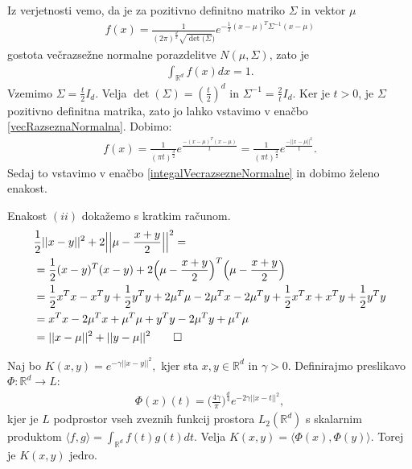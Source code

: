 \documentclass[mat1]{fmfdelo}
\newcommand{\R}{\mathbb R}
\begin{document}
\begin{dokaz}
	Iz verjetnosti vemo, da je za pozitivno definitno matriko $\Sigma$ in vektor $\mu$
	\begin{align}
	\label{vecRazseznaNormalna}
	f(x) = \frac{1}{(2\pi)^\frac{d}{2}\sqrt{\det(\Sigma})}e^{-\frac{1}{2}(x-\mu)^T\Sigma^{-1}(x-\mu)} 
	\end{align}
	gostota večrazsežne normalne porazdelitve $N(\mu, \Sigma)$, zato je 
	\begin{align}
	\label{integalVecrazsezneNormalne}
	\int_{\R^d}f(x)dx = 1.
	\end{align}
	Vzemimo $\Sigma =  \frac{t}{2}I_d$. Velja $\det(\Sigma) = (\frac{t}{2})^d$ in $\Sigma^{-1} = \frac{2}{t}I_d$. Ker je $t > 0$, je $\Sigma$ pozitivno definitna matrika, zato jo lahko vstavimo v enačbo \eqref{vecRazseznaNormalna}. Dobimo:
	\begin{align*}
	f(x) = \frac{1}{(\pi t)^\frac{d}{2}}e^{\frac{-(x-\mu)^T(x-\mu)}{t}} = \frac{1}{(\pi t)^\frac{d}{2}}e^{\frac{-||x-\mu||^2}{t}}.
	\end{align*}
	Sedaj to vstavimo v enačbo \eqref{integalVecrazsezneNormalne} in dobimo želeno enakost. 
	
	
	Enakost $(ii)$ dokažemo s kratkim računom. 
	\begin{align*}
		&\frac{1}{2}||x-y||^2+ 2\Big|\Big|\mu - \frac{x+y}{2}\Big|\Big|^2= \\
		&= \frac{1}{2}(x-y)^T(x-y) + 2\Big(\mu - \frac{x+y}{2}\Big)^T\Big(\mu - \frac{x+y}{2}\Big) \\
		&= \frac{1}{2}x^Tx- x^Ty+\frac{1}{2}y^Ty+2\mu^T\mu-2\mu^Tx -2\mu^Ty+\frac{1}{2}x^Tx+x^Ty+\frac{1}{2}y^Ty\\
		&= x^Tx  - 2\mu^Tx + \mu^T\mu + y^Ty- 2\mu^Ty + \mu^T\mu\\
		&= ||x-\mu||^2 + ||y-\mu||^2 \qedhere
	\end{align*}
\end{dokaz}

\begin{trditev}
	Naj bo $ K(x, y) = e^{-\gamma||x-y||^2}, $ kjer sta $x, y \in \R^d$ in $\gamma > 0$. Definirajmo preslikavo $\Phi: \R^d \to L$:
	\begin{align*}
	\Phi(x)(t) = \Big(\frac{4\gamma}{\pi}\Big)^\frac{d}{4}e^{-2\gamma||x-t||^2}, 
	\end{align*} 
	kjer je $L$ podprostor vseh zveznih funkcij prostora $ L_2(\R^d)$ s skalarnim produktom $\langle f, g    \rangle = \int_{\R^d}f(t)g(t)dt.$ Velja $ K(x, y) = \langle \Phi(x), \Phi(y) \rangle $. Torej je 	$K(x, y)$ jedro.
\end{trditev}
\end{document}
